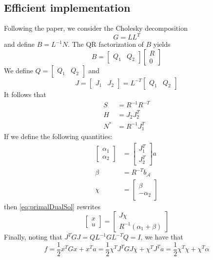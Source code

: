\documentclass[11pt,a4paper]{article}
\newcommand{\BIN}{\begin{bmatrix}}
\newcommand{\BOUT}{\end{bmatrix}}
\newcommand{\act}{\mathcal{A}}
\begin{document}
\subsection{Efficient implementation}
Following the paper, we consider the Cholesky decomposition
\begin{equation}
	G = L L^T
\end{equation}
and define $B = L^{-1} N$. The QR factorization of $B$ yields
\begin{equation}
	B = \BIN Q_1 & Q_2\BOUT \BIN R \\ 0 \BOUT
\end{equation}
We define $Q = \BIN Q_1 & Q_2\BOUT$ and
\begin{equation}
	J = \BIN J_1 & J_2\BOUT = L^{-T} \BIN Q_1 & Q_2\BOUT
\end{equation}
It follows that
\begin{align}
	S &= R^{-1}R^{-T} \\
	H &= J_2 J_2^T \\
	N^*& = R^{-1} J_1^T
\end{align}
If we define the following quantities:
\begin{align}
	\BIN \alpha_1 \\ \alpha_2 \BOUT &= \BIN J_1^T \\ J_2^T \BOUT a \\
	\beta &= R^{-T} b_\act \\
	\chi & = \BIN \beta \\ -\alpha_2 \BOUT
\end{align}
then \eqref{eq:primalDualSol} rewrites
\begin{equation}
	\BIN x \\ u \BOUT = \BIN J \chi \\ R^{-1} (\alpha_1 + \beta) \BOUT
\end{equation}
Finally, noting that $J^T G J = Q L^{-1} G L^{-T} Q = I$, we have that
\begin{equation}
	f = \frac{1}{2} x^T G x + x^T a = \frac{1}{2} \chi^T J^T G J \chi + \chi^T J^T a = \frac{1}{2} \chi^T \chi + \chi^T \alpha
\end{equation}
\end{document}
